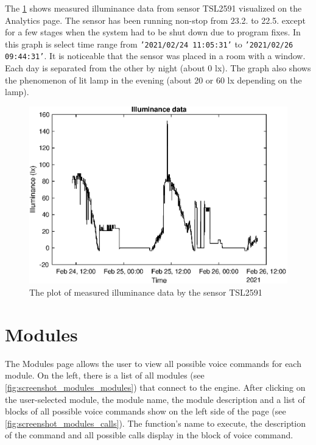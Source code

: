 The \cref{fig:illuminance_data} shows measured illuminance data from sensor TSL2591 visualized on the Analytics page. The sensor has been running non-stop from 23.2. to 22.5. except for a few stages when the system had to be shut down due to program fixes. In this graph is select time range from \texttt{'2021/02/24 11:05:31'} to \texttt{'2021/02/26 09:44:31'}. It is noticeable that the sensor was placed in a room with a window. Each day is separated from the other by night (about 0 lx). The graph also shows the phenomenon of lit lamp in the evening (about 20 or 60 lx depending on the lamp).

\begin{figure}[H]
    \centering
    \includegraphics[width=\textwidth]{img/illuminance_data.eps}
    \caption{The plot of measured illuminance data by the sensor TSL2591}
    \label{fig:illuminance_data}
\end{figure}

\section{Modules} \label{section:modules}

The Modules page allows the user to view all possible voice commands for each module. On the left, there is a list of all modules (see \cref{fig:screenshot_modules_modules}) that connect to the engine. After clicking on the user-selected module, the module name, the module description and a list of blocks of all possible voice commands show on the left side of the page (see \cref{fig:screenshot_modules_calls}). The function's name to execute, the description of the command and all possible calls display in the block of voice command.

